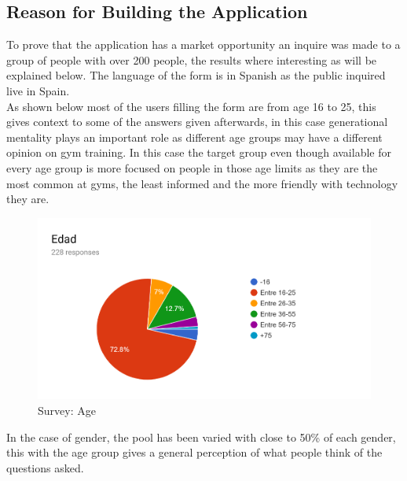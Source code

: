 \subsection{Reason for Building the Application}\label{sec:chap4_reas_app}

To prove that the application has a market opportunity an inquire was made to a group of people with over 200 people, the results where interesting as will be explained below. The language of the form is in Spanish as the public inquired live in Spain.\\

As shown below most of the users filling the form are from age 16 to 25, this gives context to some of the answers given afterwards, in this case generational mentality plays an important role as different age groups may have a different opinion on gym training. In this case the target group even though available for every age group is more focused on people in those age limits as they are the most common at gyms, the least informed and the more friendly with technology they are.

\begin{center}
	\begin{figure}[h!]
		\centering
		\includegraphics[scale=1]{./images/4-age}
		\caption{Survey: Age}
		\label{4_age}
	\end{figure}
\end{center}

In the case of gender, the pool has been varied with close to 50\% of each gender, this with the age group gives a general perception of what people think of the questions asked.

